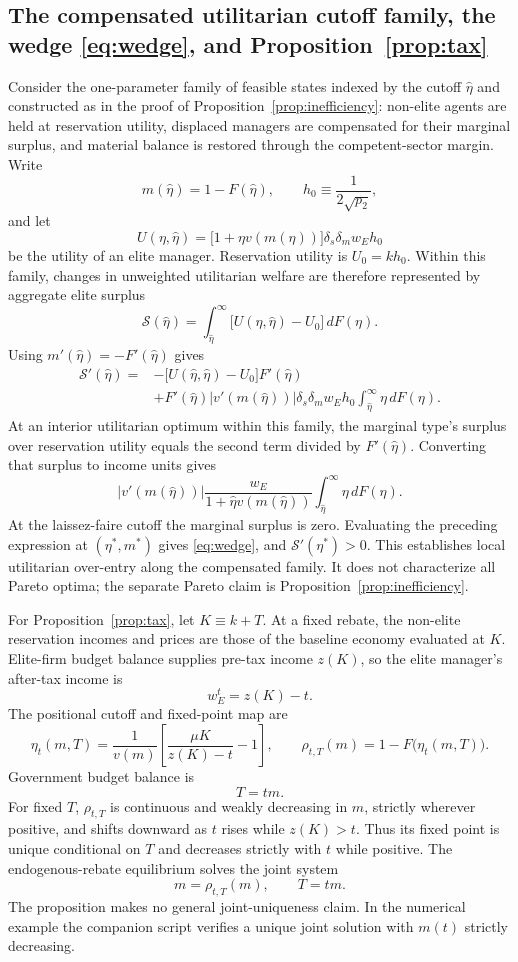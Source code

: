 \documentclass[12pt,letterpaper]{article}
\theoremstyle{definition}
\begin{document}
\subsection{The compensated utilitarian cutoff family, the wedge \eqref{eq:wedge}, and Proposition~\ref{prop:tax}}

Consider the one-parameter family of feasible states indexed by the cutoff $\hat\eta$ and constructed as in the proof of Proposition~\ref{prop:inefficiency}: non-elite agents are held at reservation utility, displaced managers are compensated for their marginal surplus, and material balance is restored through the competent-sector margin.
Write
\[
  m(\hat\eta)=1-F(\hat\eta),
  \qquad
  h_0\equiv\frac{1}{2\sqrt{p_2}},
\]
and let
\[
  U(\eta,\hat\eta)
  =
  \big[1+\eta v(m(\hat\eta))\big]
  \delta_s\delta_m w_E h_0
\]
be the utility of an elite manager.
Reservation utility is $U_0=kh_0$.
Within this family, changes in unweighted utilitarian welfare are therefore represented by aggregate elite surplus
\[
  \mathcal S(\hat\eta)
  =
  \int_{\hat\eta}^{\infty}
  \big[U(\eta,\hat\eta)-U_0\big]\,dF(\eta).
\]
Using $m'(\hat\eta)=-F'(\hat\eta)$ gives
\[
\begin{split}
  \mathcal S'(\hat\eta)
  ={}&
  -\big[U(\hat\eta,\hat\eta)-U_0\big]F'(\hat\eta)\\
  &+
  F'(\hat\eta)\left|v'(m(\hat\eta))\right|
  \delta_s\delta_m w_Eh_0
  \int_{\hat\eta}^{\infty}\eta\,dF(\eta).
\end{split}
\]
At an interior utilitarian optimum within this family, the marginal type's surplus over reservation utility equals the second term divided by $F'(\hat\eta)$.
Converting that surplus to income units gives
\[
  \left|v'(m(\hat\eta))\right|
  \frac{w_E}{1+\hat\eta v(m(\hat\eta))}
  \int_{\hat\eta}^{\infty}\eta\,dF(\eta).
\]
At the laissez-faire cutoff the marginal surplus is zero.
Evaluating the preceding expression at $(\eta^\ast,m^\ast)$ gives \eqref{eq:wedge}, and $\mathcal S'(\eta^\ast)>0$.
This establishes local utilitarian over-entry along the compensated family.
It does not characterize all Pareto optima; the separate Pareto claim is Proposition~\ref{prop:inefficiency}.

For Proposition~\ref{prop:tax}, let $K\equiv k+T$.
At a fixed rebate, the non-elite reservation incomes and prices are those of the baseline economy evaluated at $K$.
Elite-firm budget balance supplies pre-tax income $z(K)$, so the elite manager's after-tax income is
\[
  w_E^t=z(K)-t.
\]
The positional cutoff and fixed-point map are
\[
  \eta_t(m,T)
  =
  \frac{1}{v(m)}
  \left[
    \frac{\mu K}{z(K)-t}-1
  \right],
  \qquad
  \rho_{t,T}(m)
  =
  1-F\big(\eta_t(m,T)\big).
\]
Government budget balance is
\[
  T=tm.
\]
For fixed $T$, $\rho_{t,T}$ is continuous and weakly decreasing in $m$, strictly wherever positive, and shifts downward as $t$ rises while $z(K)>t$.
Thus its fixed point is unique conditional on $T$ and decreases strictly with $t$ while positive.
The endogenous-rebate equilibrium solves the joint system
\[
  m=\rho_{t,T}(m),
  \qquad
  T=tm.
\]
The proposition makes no general joint-uniqueness claim.
In the numerical example the companion script verifies a unique joint solution with $m(t)$ strictly decreasing.
\end{document}
